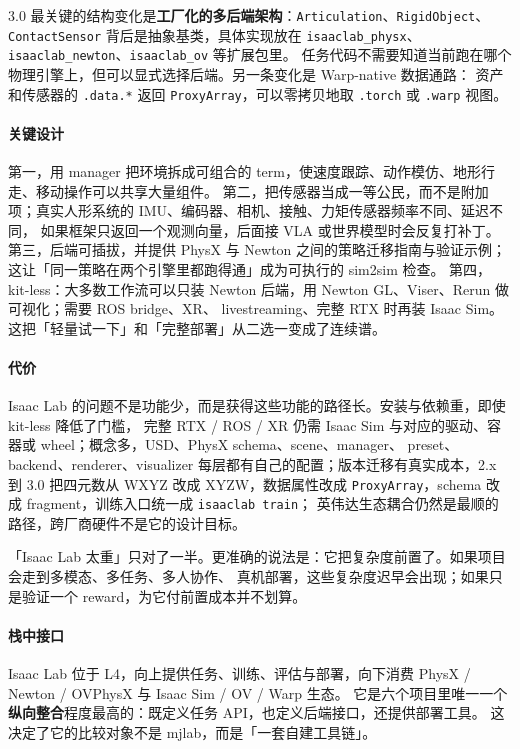 \documentclass[UTF8, 11pt, a4paper, fontset=windows]{ctexart}
\newcommand{\term}[1]{\texttt{#1}}
\begin{document}
3.0 最关键的结构变化是\textbf{工厂化的多后端架构}：\term{Articulation}、\term{RigidObject}、\term{ContactSensor}
背后是抽象基类，具体实现放在 \term{isaaclab\_physx}、\term{isaaclab\_newton}、\term{isaaclab\_ov} 等扩展包里。
任务代码不需要知道当前跑在哪个物理引擎上，但可以显式选择后端。另一条变化是 Warp-native 数据通路：
资产和传感器的 \term{.data.*} 返回 \term{ProxyArray}，可以零拷贝地取 \term{.torch} 或 \term{.warp} 视图。

\paragraph{关键设计}
第一，用 manager 把环境拆成可组合的 term，使速度跟踪、动作模仿、地形行走、移动操作可以共享大量组件。
第二，把传感器当成一等公民，而不是附加项；真实人形系统的 IMU、编码器、相机、接触、力矩传感器频率不同、延迟不同，
如果框架只返回一个观测向量，后面接 VLA 或世界模型时会反复打补丁。第三，后端可插拔，并提供 PhysX 与 Newton
之间的策略迁移指南与验证示例；这让「同一策略在两个引擎里都跑得通」成为可执行的 sim2sim 检查。
第四，kit-less：大多数工作流可以只装 Newton 后端，用 Newton GL、Viser、Rerun 做可视化；需要 ROS bridge、XR、
livestreaming、完整 RTX 时再装 Isaac Sim。这把「轻量试一下」和「完整部署」从二选一变成了连续谱。

\paragraph{代价}
Isaac Lab 的问题不是功能少，而是获得这些功能的路径长。安装与依赖重，即使 kit-less 降低了门槛，
完整 RTX / ROS / XR 仍需 Isaac Sim 与对应的驱动、容器或 wheel；概念多，USD、PhysX schema、scene、manager、
preset、backend、renderer、visualizer 每层都有自己的配置；版本迁移有真实成本，2.x 到 3.0 把四元数从 WXYZ
改成 XYZW，数据属性改成 \term{ProxyArray}，schema 改成 fragment，训练入口统一成 \term{isaaclab train}；
英伟达生态耦合仍然是最顺的路径，跨厂商硬件不是它的设计目标。

\begin{caution}
「Isaac Lab 太重」只对了一半。更准确的说法是：它把复杂度前置了。如果项目会走到多模态、多任务、多人协作、
真机部署，这些复杂度迟早会出现；如果只是验证一个 reward，为它付前置成本并不划算。
\end{caution}

\paragraph{栈中接口}
Isaac Lab 位于 L4，向上提供任务、训练、评估与部署，向下消费 PhysX / Newton / OVPhysX 与 Isaac Sim / OV / Warp 生态。
它是六个项目里唯一一个\textbf{纵向整合}程度最高的：既定义任务 API，也定义后端接口，还提供部署工具。
这决定了它的比较对象不是 mjlab，而是「一套自建工具链」。
\end{document}
